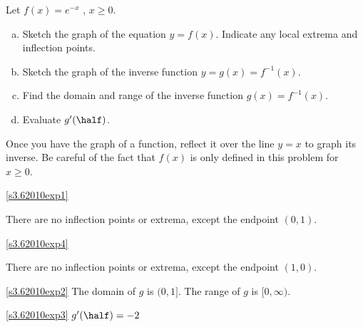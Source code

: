 \begin{question}[2010H]
 Let $f(x) = e^{-x}$ , $x \ge 0$.
\begin{enumerate}[(a)]
\item\label{s3.62010exp1} Sketch the graph of the equation $y = f(x)$. Indicate any
local extrema and inflection points.
\item\label{s3.62010exp4} Sketch the graph of  the inverse function $y = g (x)=f^{-1}(x)$.
\item\label{s3.62010exp2} Find the domain and range of the inverse function $g(x)= f^{-1}(x)$.
\item\label{s3.62010exp3} Evaluate $g'(\half)$.
\end{enumerate}
\end{question}
\begin{hint}
Once you have the graph of a function, reflect it over the line $y=x$ to graph its inverse.
Be careful of the fact that $f(x)$ is only defined in this problem for $x \geq 0$.
\end{hint}
\begin{answer}
\eqref{s3.62010exp1}
\begin{center}\end{center}
There are no inflection points or extrema, except the endpoint $(0,1)$.

\eqref{s3.62010exp4}

\begin{center}\end{center}
There are no inflection points or extrema, except the endpoint $(1,0)$.

\eqref{s3.62010exp2}
The domain of $g$ is  $(0,1]$.
The range of $g$ is $[0,\infty)$.

\eqref{s3.62010exp3}
$g'(\half)=-2$
\end{answer}
